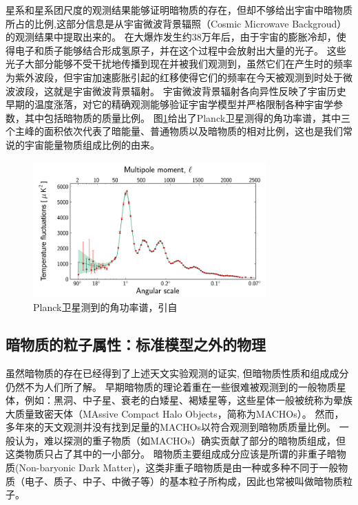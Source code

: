 星系和星系团尺度的观测结果能够证明暗物质的存在，但却不够给出宇宙中暗物质所占的比例,这部分信息是从宇宙微波背景辐照（Cosmic Microwave Backgroud）的观测结果中提取出来的。
在大爆炸发生约38万年后，由于宇宙的膨胀冷却，使得电子和质子能够结合形成氢原子，并在这个过程中会放射出大量的光子。
这些光子大部分能够不受干扰地传播到现在并被我们观测到，虽然它们在产生时的频率为紫外波段，但宇宙加速膨胀引起的红移使得它们的频率在今天被观测到时处于微波波段，这就是宇宙微波背景辐射。
宇宙微波背景辐射各向异性反映了宇宙历史早期的温度涨落，对它的精确观测能够验证宇宙学模型并严格限制各种宇宙学参数\parencite{bertone_particle_2005}，其中包括暗物质的质量比例。
图\ref{fig:introduction:planck_power_law}给出了Planck卫星测得的角功率谱，其中三个主峰的面积依次代表了暗能量、普通物质以及暗物质的相对比例，这也是我们常说的宇宙能量物质组成比例的由来。
\begin{figure}[htbp]
	\centering
	\includegraphics[width=0.8\textwidth]{chap/introduction/fig/planck_power_law.png}
	\caption{Planck卫星测到的角功率谱，引自\parencite{planck_collaboration_planck_2014}}
	\label{fig:introduction:planck_power_law}
\end{figure}

\subsection{暗物质的粒子属性：标准模型之外的物理}
虽然暗物质的存在已经得到了上述天文实验观测的证实, 但暗物质性质和组成成分仍然不为人们所了解。
早期暗物质的理论着重在一些很难被观测到的一般物质星体，例如：黑洞、中子星、衰老的白矮星、褐矮星等，这些星体一般被统称为晕族大质量致密天体（MAssive Compact Halo Objects，简称为MACHOs）。
然而，多年來的天文观测并没有找到足量的MACHOs以符合观测到暗物质质量比例\parencite{tisserand_limits_2007}。
一般认为，难以探测的重子物质（如MACHOs）确实贡献了部分的暗物质组成，但这类物质只占了其中的一小部分\parencite{freese_death_2000}。
暗物质主要组成成分应该是所谓的非重子暗物质(Non-baryonic Dark Matter)，这类非重子暗物质是由一种或多种不同于一般物质（电子、质子、中子、中微子等）的基本粒子所构成，因此也常被叫做暗物质粒子。

